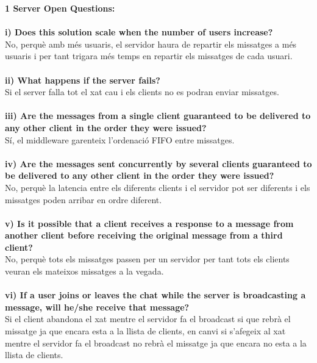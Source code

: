 \documentclass[a4paper, 10pt]{article}
\begin{document}
\begin{itemize}



\textbf{1 Server Open Questions:}\\
\\
\textbf{i) Does  this  solution  scale  when  the  number  of  users
increase?\\}No, perquè amb més usuaris, el servidor haura de repartir els missatges a més usuaris i per tant trigara més temps en repartir els missatges de cada usuari.\\
\\
\textbf{ii) What happens if the server fails?\\} Si el server falla tot el xat cau i els clients no es podran enviar missatges.\\
\\
\textbf{iii) Are  the  messages  from  a
single client guaranteed to be delivered to any other client in the order they were
issued? \\} Sí, el middleware garenteix l'ordenació FIFO entre missatges.\\ 
\\
\textbf{iv) Are the messages sent concurrently by several clients guaranteed to be delivered
to any other client in the order they were issued?\\} No, perquè la latencia entre els diferents clients i el servidor pot ser diferents i els missatges poden arribar en ordre diferent.\\
\\
\textbf{v) Is it possible that a client
receives a response to a message from another client before receiving the original
message from a third client?\\} No, perquè tots els missatges passen per un servidor per tant tots els clients veuran els mateixos missatges a la vegada.\\
\\
\textbf{vi) If a user joins or leaves the chat while the server
is broadcasting a message, will he/she receive that message?\\} Si el client abandona el xat mentre el servidor fa el broadcast si que rebrà el missatge ja que encara esta a la llista de clients, en canvi si s'afegeix al xat mentre el servidor fa el broadcast no rebrà el missatge ja que encara no esta a la  llista de clients.\\
\\

\newpage


\end{itemize}
\end{document}
